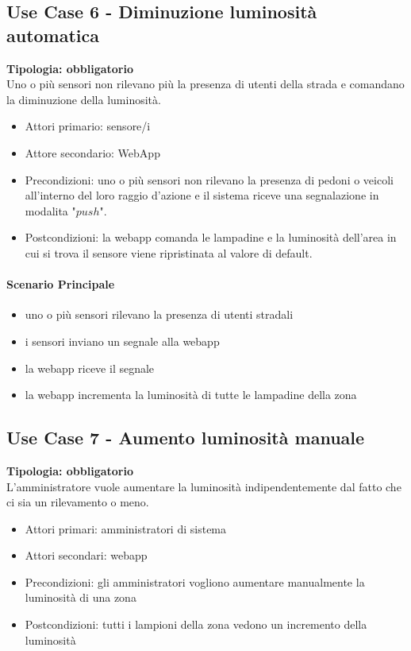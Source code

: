 \documentclass[12pt]{article}
\begin{document}
\subsection{Use Case 6 - Diminuzione luminosità automatica}
\textbf{Tipologia: obbligatorio}\\
Uno o più sensori non rilevano più la presenza di utenti della strada e comandano la diminuzione della luminosità.
\begin{itemize}
	\item Attori primario: sensore/i
	\item Attore secondario: WebApp
	\item Precondizioni: uno o più sensori non rilevano la presenza di pedoni o veicoli all'interno del loro raggio d'azione e il sistema riceve una segnalazione in modalita "$push$".
	\item Postcondizioni: la webapp comanda le lampadine e la luminosità dell'area in cui si trova il sensore viene ripristinata al valore di default.
\end{itemize}
\paragraph{Scenario Principale}
\begin{itemize}
	\item uno o più sensori rilevano la presenza di utenti stradali
	\item i sensori inviano un segnale alla webapp
	\item la webapp riceve il segnale
	\item la webapp incrementa la luminosità di tutte le lampadine della zona
\end{itemize}

\subsection{Use Case 7 - Aumento luminosità manuale}
\textbf{Tipologia: obbligatorio} \\
L'amministratore vuole aumentare la luminosità indipendentemente dal fatto che ci sia un rilevamento o meno.
\begin{itemize}
	\item Attori primari: amministratori di sistema
	\item Attori secondari: webapp
	\item Precondizioni: gli amministratori vogliono aumentare manualmente la luminosità di una zona
	\item Postcondizioni: tutti i lampioni della zona vedono un incremento della luminosità
\end{itemize}
\end{document}
